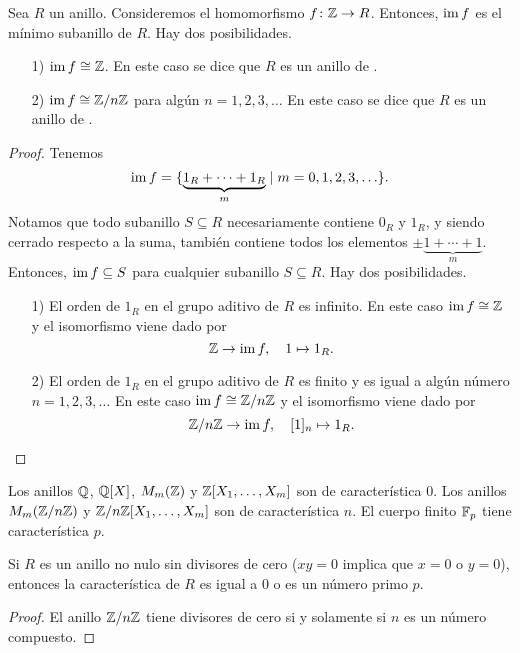 \begin{proposicion}
  Sea $R$ un anillo. Consideremos el homomorfismo $f\colon \mathbb{Z} \to R$. Entonces,
  $\operatorname{im} f$ es el mínimo subanillo de $R$. Hay dos posibilidades.

  \begin{enumerate}
  \item[1)] $\operatorname{im} f \cong \mathbb{Z}$. En este caso se dice que $R$ es un anillo
    de .

  \item[2)] $\operatorname{im} f \cong \mathbb{Z}/n\mathbb{Z}$ para algún $n = 1,2,3,\ldots$ En este caso
    se dice que $R$ es un anillo de
    .
  \end{enumerate}

  \begin{proof}
    Tenemos
    $$\operatorname{im} f = \{ \underbrace{1_R + \cdots + 1_R}_m \mid m = 0,1,2,3,\ldots \}.$$
    Notamos que todo subanillo $S \subseteq R$ necesariamente contiene $0_R$ y
    $1_R$, y siendo cerrado respecto a la suma, también contiene todos los
    elementos $\pm\underbrace{1 + \cdots + 1}_m$. Entonces, $\operatorname{im} f \subseteq S$
    para cualquier subanillo $S \subseteq R$. Hay dos posibilidades.

    \begin{enumerate}
    \item[1)] El orden de $1_R$ en el grupo aditivo de $R$ es infinito. En este
      caso $\operatorname{im} f \cong \mathbb{Z}$ y el isomorfismo viene dado por
      $$\mathbb{Z} \to \operatorname{im} f, \quad 1 \mapsto 1_R.$$

    \item[2)] El orden de $1_R$ en el grupo aditivo de $R$ es finito y es igual
      a algún número $n = 1,2,3,\ldots$ En este caso $\operatorname{im} f \cong \mathbb{Z}/n\mathbb{Z}$ y
      el isomorfismo viene dado por
      $$\mathbb{Z}/n\mathbb{Z} \to \operatorname{im} f, \quad [1]_n \mapsto 1_R.$$
    \end{enumerate}
  \end{proof}
\end{proposicion}

\begin{ejemplo}
  Los anillos $\mathbb{Q}$, $\mathbb{Q} [X]$, $M_m (\mathbb{Z})$ y $\mathbb{Z} [X_1,\ldots,X_m]$ son de
  característica $0$. Los anillos $M_m (\mathbb{Z}/n\mathbb{Z})$ y $\mathbb{Z}/n\mathbb{Z} [X_1,\ldots,X_m]$
  son de característica $n$. El cuerpo finito $\mathbb{F}_p$ tiene característica $p$.
\end{ejemplo}

\begin{observacion}
  Si $R$ es un anillo no nulo sin divisores de cero ($xy = 0$ implica que
  $x = 0$ o $y = 0$), entonces la característica de $R$ es igual a $0$ o es
  un número primo $p$.

  \begin{proof}
    El anillo $\mathbb{Z}/n\mathbb{Z}$ tiene divisores de cero si y solamente si $n$ es
    un número compuesto.
  \end{proof}
\end{observacion}

